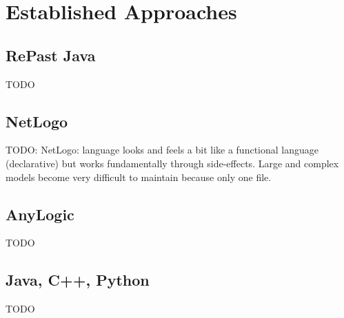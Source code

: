\section{Established Approaches}

\subsection{RePast Java}
TODO

\subsection{NetLogo}
TODO: NetLogo: language looks and feels a bit like a functional language (declarative) but works fundamentally through side-effects. Large and complex models become very difficult to maintain because only one file.

\subsection{AnyLogic}
TODO

\subsection{Java, C++, Python}
TODO